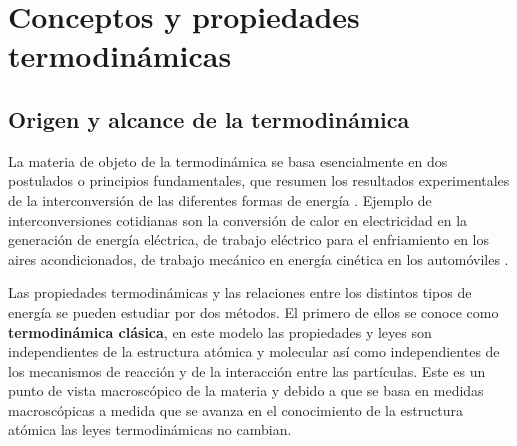 \documentclass[master.tex]{subfiles}
\begin{document}
    \section{Conceptos y propiedades termodinámicas}

    \subsection{Origen y alcance de la termodinámica}

    La materia de objeto de la termodinámica se basa esencialmente en dos postulados o principios fundamentales, que resumen los resultados experimentales de la interconversión de las diferentes formas de energía \parencite{glasstone}. Ejemplo de interconversiones cotidianas son la conversión de calor en electricidad en la generación de energía eléctrica, de trabajo eléctrico para el enfriamiento en los aires acondicionados, de trabajo mecánico en energía cinética en los automóviles \parencite{faires}.

    Las propiedades termodinámicas y las relaciones entre los distintos tipos de energía se pueden estudiar por dos métodos. El primero de ellos se conoce como \textbf{termodinámica clásica}, en este modelo las propiedades y leyes son independientes de la estructura atómica y molecular así como independientes de los mecanismos de reacción y de la interacción entre las partículas. Este es un punto de vista macroscópico de la materia y debido a que se basa en medidas macroscópicas a medida que se avanza en el conocimiento de la estructura atómica las leyes termodinámicas no cambian. \parencites{faires}{glasstone}{wark}
\end{document}

